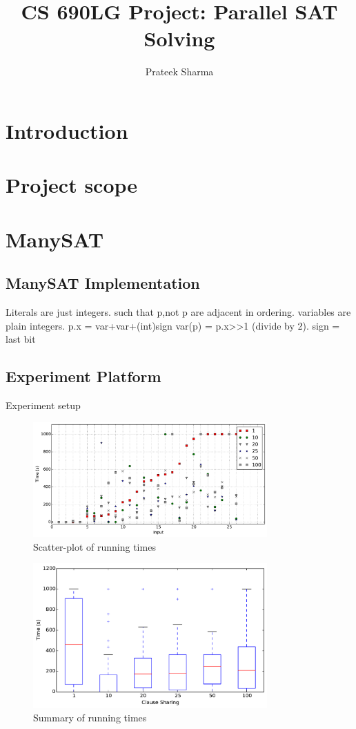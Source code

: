 \documentclass{article}
\title{CS 690LG Project: Parallel SAT Solving}
\author{Prateek Sharma}
\begin{document}
\maketitle
\section{Introduction}


\section{Project scope}


\section{ManySAT}

\subsection{ManySAT Implementation}

Literals are just integers. such that p,not p are adjacent in ordering. 
variables are plain integers. p.x = var+var+(int)sign
var(p) = p.x>>1 (divide by 2). sign = last bit 

\subsection{Experiment Platform}
Experiment setup

\begin{figure}[h]
  \centering
  \includegraphics[width=0.8\textwidth]{../figs/scatter_all.pdf}
  \caption{Scatter-plot of running times}
  \label{fig:scatter-1}
\end{figure}

\begin{figure}[h]
  \centering
    \includegraphics[width=0.8\textwidth]{../figs/boxplot_all.pdf}
  \caption{Summary of running times}
  \label{fig:boxplot-1}
\end{figure}
\end{document}
